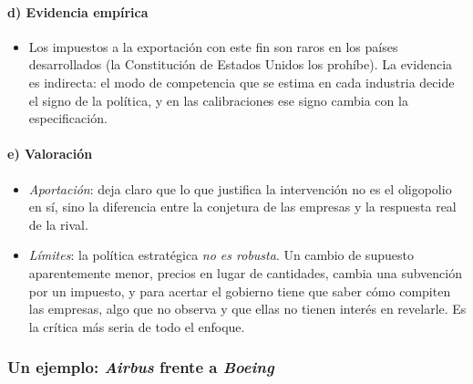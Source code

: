 \documentclass[11pt]{article}
\begin{document}
\paragraph{d) Evidencia empírica}

\begin{itemize}
\item Los impuestos a la exportación con este fin son raros en los países desarrollados (la Constitución de Estados Unidos los prohíbe). La evidencia es indirecta: el modo de competencia que se estima en cada industria decide el signo de la política, y en las calibraciones ese signo cambia con la especificación\nocite{KrishnaHoganSwagel1989Non}.
\end{itemize}

\paragraph{e) Valoración}

\begin{itemize}
\item \emph{Aportación}: deja claro que lo que justifica la intervención no es el oligopolio en sí, sino la diferencia entre la conjetura de las empresas y la respuesta real de la rival.
\item \emph{Límites}: la política estratégica \emph{no es robusta}. Un cambio de supuesto aparentemente menor, precios en lugar de cantidades, cambia una subvención por un impuesto, y para acertar el gobierno tiene que saber cómo compiten las empresas, algo que no observa y que ellas no tienen interés en revelarle. Es la crítica más seria de todo el enfoque\nocite{Brander1995Strategic}.
\end{itemize}

\subsubsection{Un ejemplo: \emph{Airbus} frente a \emph{Boeing}}\label{sec:airbus-boeing}
\end{document}
